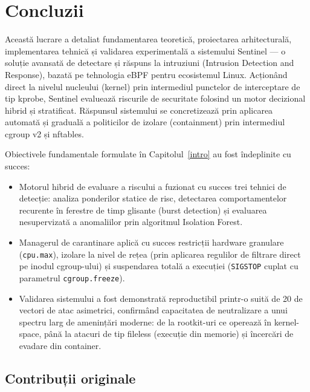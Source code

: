 \chapter{Concluzii}
\label{conclusions}

\par Această lucrare a detaliat fundamentarea teoretică, proiectarea arhitecturală, implementarea tehnică și validarea experimentală a sistemului Sentinel --- o soluție avansată de detectare și răspuns la intruziuni (Intrusion Detection and Response), bazată pe tehnologia eBPF pentru ecosistemul Linux. Acționând direct la nivelul nucleului (kernel) prin intermediul punctelor de interceptare de tip kprobe, Sentinel evaluează riscurile de securitate folosind un motor decizional hibrid și stratificat. Răspunsul sistemului se concretizează prin aplicarea automată și graduală a politicilor de izolare (containment) prin intermediul cgroup v2 și nftables.

\par Obiectivele fundamentale formulate în Capitolul~\ref{intro} au fost îndeplinite cu succes:

\begin{itemize}
    \item Motorul hibrid de evaluare a riscului a fuzionat cu succes trei tehnici de detecție: analiza ponderilor statice de risc, detectarea comportamentelor recurente în ferestre de timp glisante (burst detection) și evaluarea nesupervizată a anomaliilor prin algoritmul Isolation Forest.
    \item Managerul de carantinare aplică cu succes restricții hardware granulare (\texttt{cpu.max}), izolare la nivel de rețea (prin aplicarea regulilor de filtrare direct pe inodul cgroup-ului) și suspendarea totală a execuției (\texttt{SIGSTOP} cuplat cu parametrul \texttt{cgroup.freeze}).
    \item Validarea sistemului a fost demonstrată reproductibil printr-o suită de 20 de vectori de atac asimetrici, confirmând capacitatea de neutralizare a unui spectru larg de amenințări moderne: de la rootkit-uri ce operează în kernel-space, până la atacuri de tip fileless (execuție din memorie) și încercări de evadare din container.
\end{itemize}


\section*{Contribuții originale}

